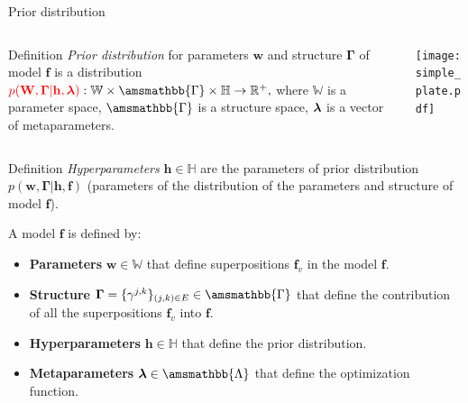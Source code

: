 \documentclass[usenames,dvipsnames,11pt,pdf,utf8,russian,aspectratio=43]{beamer}
\begin{document}
\begin{frame}{Prior distribution}
\footnotesize   
\begin{columns}
\begin{column}{0.6\textwidth}
   \begin{block}{Definition}
\textit{Prior distribution} for parameters $\mathbf{w}$ and structure $\boldsymbol{\Gamma}$ of model $\mathbf{f}$ is a distribution
$
    \textcolor{red}{p(\mathbf{W}, \boldsymbol{\Gamma}|\mathbf{h},\lam)}: \mathbb{W} \times \amsmathbb{\Gamma} \times \mathbb{H} \to \mathbb{R}^{+}, 
$
where $\mathbb{W}$ is a parameter space, $\amsmathbb{\Gamma}$ is a structure space, $\boldsymbol{\lambda}$ is a vector of metaparameters.
\end{block}

\end{column}
\begin{column}{0.4\textwidth}  %
    \begin{center}
     \texttt{[image: simple\_plate.pdf]}
     \end{center}
\end{column}
\end{columns}
\vspace*{-0.5cm}
\begin{block}{Definition}
\textit{Hyperparameters} $\mathbf{h}\in \mathbb{H}$ are the parameters of prior distribution $p(\mathbf{w}, \boldsymbol{\Gamma}|\mathbf{h},\mathbf{f})$ (parameters of the distribution of the parameters and structure  of model $\mathbf{f}$).
 
\end{block}
A model $\mathbf{f}$ is defined by:
\begin{itemize}
\item \textbf{Parameters} $\mathbf{w} \in \mathbb{W}$ that define superpositions  $\mathbf{f}_v$ in the model $\mathbf{f}$.
\item \textbf{Structure} $\boldsymbol{\Gamma}=\{\gamma^{j,k}\}_{(j,k)\in E} \in \amsmathbb{\Gamma}$ that define the contribution of all the superpositions  $\mathbf{f}_v$ into $\mathbf{f}$.
\item \textbf{Hyperparameters} $\mathbf{h} \in \mathbb{H}$ that define the prior distribution.
\item \textbf{Metaparameters} $\boldsymbol{\lambda} \in \amsmathbb{\Lambda}$ that define the optimization function.
\end{itemize}

\end{frame}
\end{document}
